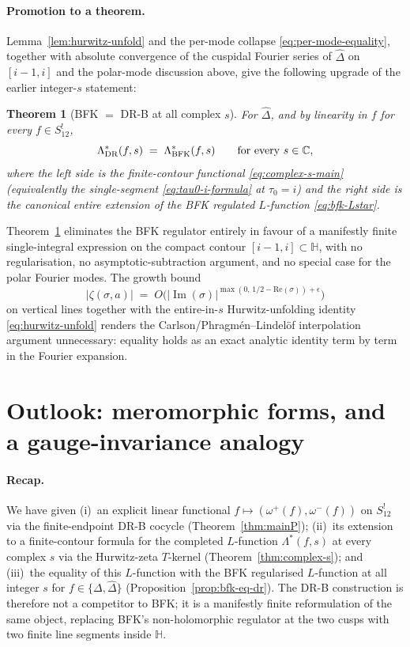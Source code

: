 \documentclass[11pt,letterpaper]{article}
\newtheorem{theorem}{Theorem}[section]
\newcommand{\HH}{\mathbb{H}}
\newcommand{\CC}{\mathbb{C}}
\newcommand{\Dhat}{\widehat{\Delta}}
\DeclareMathOperator{\im}{Im}
\begin{document}
\paragraph{Promotion to a theorem.}
Lemma~\ref{lem:hurwitz-unfold} and the per-mode collapse \eqref{eq:per-mode-equality}, together with absolute convergence of the cuspidal Fourier series of $\Dhat$ on $[i-1, i]$ and the polar-mode discussion above, give the following upgrade of the earlier integer-$s$ statement:

\begin{theorem}[BFK $=$ DR-B at all complex $s$]\label{thm:bfk-dr-allS}
For $\Dhat$, and by linearity in $f$ for every $f \in S^!_{12}$,
\[
\Lambda^*_{\rm DR}(f, s) \;=\; \Lambda^*_{\rm BFK}(f, s) \qquad \text{for every } s \in \CC,
\]
where the left side is the finite-contour functional \eqref{eq:complex-s-main} (equivalently the single-segment \eqref{eq:tau0-i-formula} at $\tau_0 = i$) and the right side is the canonical entire extension of the BFK regulated $L$-function \eqref{eq:bfk-Lstar}.
\end{theorem}

Theorem~\ref{thm:bfk-dr-allS} eliminates the BFK regulator entirely in favour of a manifestly finite single-integral expression on the compact contour $[i-1, i] \subset \HH$, with no regularisation, no asymptotic-subtraction argument, and no special case for the polar Fourier modes.  The growth bound
\[
|\zeta(\sigma, a)| \;=\; O\!\bigl(|\im(\sigma)|^{\max(0,\,1/2 - \mathrm{Re}(\sigma)) + \epsilon}\bigr)
\]
on vertical lines \cite[\S25.11.36]{DLMF} together with the entire-in-$s$ Hurwitz-unfolding identity \eqref{eq:hurwitz-unfold} renders the Carlson/Phragm\'en--Lindel\"of interpolation argument unnecessary: equality holds as an exact analytic identity term by term in the Fourier expansion.

\section{Outlook: meromorphic forms, and a gauge-invariance analogy}\label{sec:outlook}

\paragraph{Recap.}
We have given (i)~an explicit linear functional
$f \mapsto (\omega^+(f), \omega^-(f))$ on $S_{12}^!$ via the
finite-endpoint DR-B cocycle (Theorem~\ref{thm:mainP}); (ii)~its
extension to a finite-contour formula for the completed $L$-function
$\Lambda^*(f, s)$ at every complex $s$ via the Hurwitz-zeta
$T$-kernel (Theorem~\ref{thm:complex-s}); and (iii)~the equality of
this $L$-function with the BFK regularised $L$-function at all integer
$s$ for $f \in \{\Delta, \Dhat\}$ (Proposition~\ref{prop:bfk-eq-dr}).
The DR-B construction is therefore not a competitor to BFK; it is a
manifestly finite reformulation of the same object, replacing BFK's
non-holomorphic regulator at the two cusps with two finite line
segments inside $\HH$.
\end{document}
